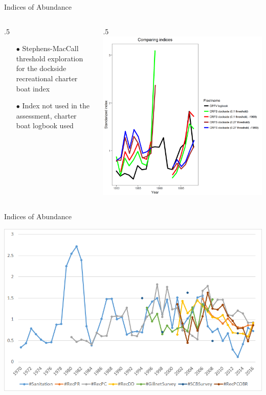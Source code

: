 \documentclass[ignorenonframetext,]{beamer}
\def\begincols{\begin{columns}}
\def\begincol{\begin{column}}
\def\endcol{\end{column}}
\def\endcols{\end{columns}}
\begin{document}
\begin{frame}{Indices of Abundance}

\begincols
 \begincol{.5\textwidth}

\begin{itemize}
\item[$\bullet$] Stephens-MacCall threshold exploration for the dockside recreational charter boat index
\item[$\bullet$] Index not used in the assessment, charter boat logbook used
\end{itemize}

\endcol
 \begincol{.5\textwidth}
\includegraphics{Figures/Fleet5_RecPC_dockside_index_compare.png}
\endcol
\endcols

\end{frame}

\begin{frame}{Indices of Abundance}

\includegraphics{Figures/All_indices.png}

\end{frame}
\end{document}
